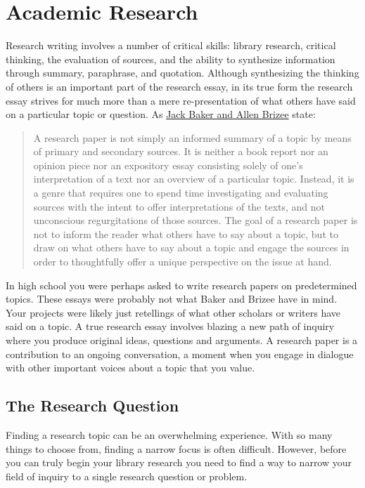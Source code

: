 
\chapter{Academic Research}
Research writing involves a number of critical skills: library research, 
critical thinking, the evaluation of sources, and the ability to synthesize 
information through summary, paraphrase, and quotation. Although synthesizing 
the thinking of others is an important part of the research essay, in its true 
form the research essay strives for much more than a mere re-presentation of 
what others have said on a particular topic or question. As \href{http://owl.english.purdue.edu/owl/resource/658/02/}{Jack Baker and Allen Brizee} state:

\begin{quote}A research paper is not simply an informed summary of a topic by 
means of primary and secondary sources. It is neither a book report nor an 
opinion piece nor an expository essay consisting solely of one's interpretation 
of a text nor an overview of a particular topic. Instead, it is a genre that 
requires one to spend time investigating and evaluating sources with the intent 
to offer interpretations of the texts, and not unconscious regurgitations of 
those sources. The goal of a research paper is not to inform the reader what 
others have to say about a topic, but to draw on what others have to say about 
a topic and engage the sources in order to thoughtfully offer a unique 
perspective on the issue at hand.\end{quote}

In high school you were perhaps asked to write research papers on predetermined 
topics. These essays were probably not what Baker and Brizee have in mind. Your 
projects were likely just retellings of what other scholars or writers have 
said on a topic. A true research essay involves blazing a new path of inquiry 
where you produce original ideas, questions and arguments. A research paper is 
a contribution to an ongoing conversation, a moment when you engage in dialogue 
with other important voices about a topic that you value.

\section{The Research Question}

Finding a research topic can be an overwhelming experience. With so many things 
to choose from, finding a narrow focus is often difficult. However, before you 
can truly begin your library research you need to find a way to narrow your 
field of inquiry to a single research question or problem.

